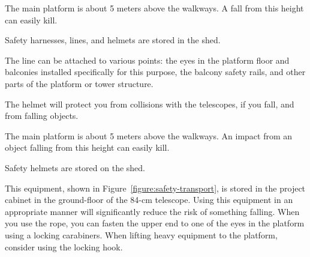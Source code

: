 
The main platform is about 5 meters above the walkways. A fall from this height can easily kill.

Safety harnesses, lines, and helmets are stored in the shed.

The line can be attached to various points: the eyes in the platform floor and balconies installed specifically for this purpose, the balcony safety rails, and other parts of the platform or tower structure.

The helmet will protect you from collisions with the telescopes, if you fall, and from falling objects.


The main platform is about 5 meters above the walkways. An impact from an object falling from this height can easily kill.

Safety helmets are stored on the shed.


This equipment, shown in Figure~\ref{figure:safety-transport}, is stored in the project cabinet in the ground-floor of the 84-cm telescope. Using this equipment in an appropriate manner will significantly reduce the risk of something falling. When you use the rope, you can fasten the upper end to one of the eyes in the platform using a locking carabiners. When lifting heavy equipment to the platform, consider using the locking hook.

